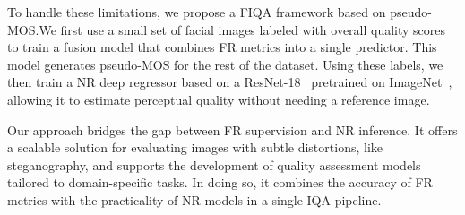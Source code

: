 To handle these limitations, we propose a FIQA framework based on pseudo-MOS.\@ We first use a small set of facial images labeled with overall quality scores to train a fusion model that combines FR metrics into a single predictor. This model generates pseudo-MOS for the rest of the dataset. Using these labels, we then train a NR deep regressor based on a ResNet-18~\cite{resnet} pretrained on ImageNet~\cite{imagenet}, allowing it to estimate perceptual quality without needing a reference image.

Our approach bridges the gap between FR supervision and NR inference. It offers a scalable solution for evaluating images with subtle distortions, like steganography, and supports the development of quality assessment models tailored to domain-specific tasks. In doing so, it combines the accuracy of FR metrics with the practicality of NR models in a single IQA pipeline.
